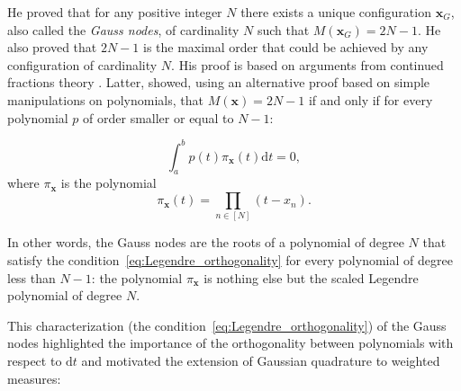 \documentclass[twoside,11pt]{book}
\numberwithin{theorem}{chapter}
\numberwithin{definition}{chapter}
\numberwithin{proposition}{chapter}
\numberwithin{corollary}{chapter}
\numberwithin{example}{chapter}
\numberwithin{lemma}{chapter}
\begin{document}
He proved that for any positive integer $N$ there exists a unique configuration $\bm{x}_{G}$, also called the \emph{Gauss nodes}, of cardinality $N$ such that $M(\bm{x}_{G}) = 2N-1$. He also proved that $2N-1$ is the maximal order that could be achieved by any configuration of cardinality $N$. His proof \citep{Gau1815} is based on arguments from continued fractions theory \citep{Khi97}.
Latter, \cite{Jac1826} showed, using an alternative proof based on simple manipulations on polynomials, that $M(\bm{x}) = 2N-1$ if and only if for every polynomial $p$ of order smaller or equal to $N-1$:

\begin{equation}\label{eq:Legendre_orthogonality}
\int_{a}^{b} p(t) \pi_{\bm{x}}(t) \mathrm{d}t = 0,
\end{equation}
where $\pi_{\bm{x}}$ is the polynomial
\begin{equation}
\pi_{\bm{x}}(t) = \prod\limits_{n \in [N]}(t-x_{n}).
\end{equation}



 In other words, the Gauss nodes are the roots of a polynomial of degree $N$ that satisfy the condition~\eqref{eq:Legendre_orthogonality} for every polynomial of degree less than $N-1$: the polynomial $\pi_{\bm{x}}$ is nothing else but the scaled Legendre polynomial of degree $N$.



 This characterization (the condition~\eqref{eq:Legendre_orthogonality}) of the Gauss nodes highlighted the importance of the orthogonality between polynomials with respect to $\mathrm{d}t$ and motivated the extension of Gaussian quadrature to weighted measures:
\end{document}
